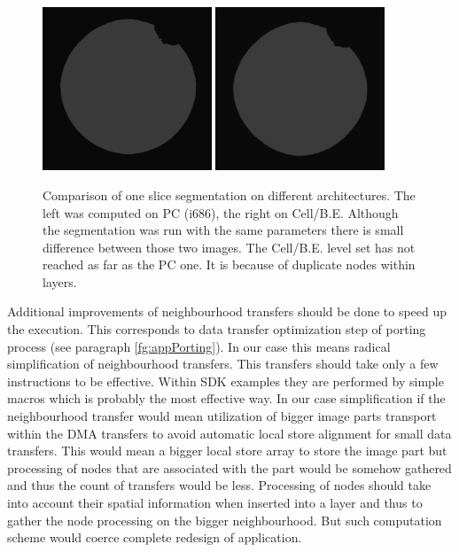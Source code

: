 \begin{figure}
    \centering
    \includegraphics[width=0.45\textwidth]{data/png/pcSlice}
    \includegraphics[width=0.45\textwidth]{data/png/cellSlice}
    \caption[Comparison of one slice segmented on different architectures]{Comparison of one slice segmentation on different architectures.
The left was computed on PC (i686), the right on \mbox{Cell/B.E.}
Although the segmentation was run with the same parameters there is small difference between those two images.
The \mbox{Cell/B.E.} level set has not reached as far as the PC one.
It is because of duplicate nodes within layers.
}
    \label{fg:sliceComparison}
\end{figure}

\par
Additional improvements of neighbourhood transfers should be done to speed up the execution.
This corresponds to data transfer optimization step of porting process (see paragraph \ref{fg:appPorting}).
In our case this means radical simplification of neighbourhood transfers.
This transfers should take only a few instructions to be effective.
Within SDK examples they are performed by simple macros which is probably the most effective way.
In our case simplification if the neighbourhood transfer would mean utilization of bigger image parts transport within the DMA transfers to avoid automatic local store alignment for small data transfers.
This would mean a bigger local store array to store the image part but processing of nodes that are associated with the part would be somehow gathered and thus the count of transfers would be less.
Processing of nodes should take into account their spatial information when inserted into a layer and thus to gather the node processing on the bigger neighbourhood.
But such computation scheme would coerce complete redesign of application.

